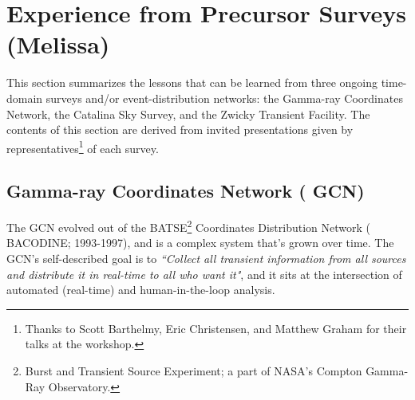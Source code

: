 \section{Experience from Precursor Surveys (Melissa) } \label{sec:precursor}



This section summarizes the lessons that can be learned from three ongoing time-domain surveys and/or event-distribution networks: the Gamma-ray Coordinates Network, the Catalina Sky Survey, and the Zwicky Transient Facility.
The contents of this section are derived from invited presentations given by representatives\footnote{Thanks to Scott Barthelmy, Eric Christensen, and Matthew Graham for their talks at the workshop.} of each survey.

\subsection{Gamma-ray Coordinates Network ( {GCN})}

The  {GCN} evolved out of the  {BATSE}\footnote{Burst and Transient  {Source} Experiment; a part of  {NASA}'s Compton Gamma-Ray Observatory.} Coordinates Distribution Network ( {BACODINE}; 1993-1997), and is a complex system that's grown over time.
The  {GCN}'s self-described goal is to {\it ``Collect all  {transient} information from all sources and distribute it in real-time to all who want it"}, and it sits at the intersection of automated (real-time) and human-in-the-loop analysis.

